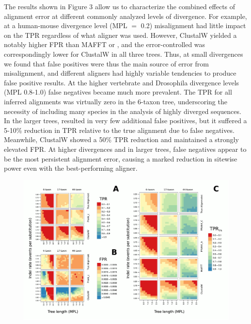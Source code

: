 \documentclass{mbe}
\begin{document}
The results shown in Figure 3 allow us to characterize the combined
effects of alignment error at different commonly analyzed levels of
divergence. For example, at a human-mouse divergence level (MPL $=$
0.2) misalignment had little impact on the TPR regardless of what
aligner was used. However, ClustalW yielded a notably higher FPR than
MAFFT or \prankc{}, and the error-controlled \tpr{} was
correspondingly lower for ClustalW in all three trees. Thus, at small
divergences we found that false positives were thus the main source of
error from misalignment, and different aligners had highly variable
tendencies to produce false positive results. At the higher vertebrate
and Drosophila divergence levels (MPL 0.8-1.0) false negatives became
much more prevalent. The TPR for all inferred alignments was virtually
zero in the 6-taxon tree, underscoring the necessity of including many
species in the analysis of highly diverged sequences. In the larger
trees, \prankc{} resulted in very few additional false positives, but
it suffered a 5-10\% reduction in TPR relative to the true alignment
due to false negatives. Meanwhile, ClustalW showed a 50\% TPR
reduction and maintained a strongly elevated FPR. At higher
divergences and in larger trees, false negatives appear to be the most
persistent alignment error, causing a marked reduction in sitewise
power even with the best-performing aligner.

\begin{figure}[t]
\begin{center}
\includegraphics[scale=0.8]{fig4.pdf}
\end{center}
\caption{}
\label{fig_4}
\end{figure}
\end{document}
